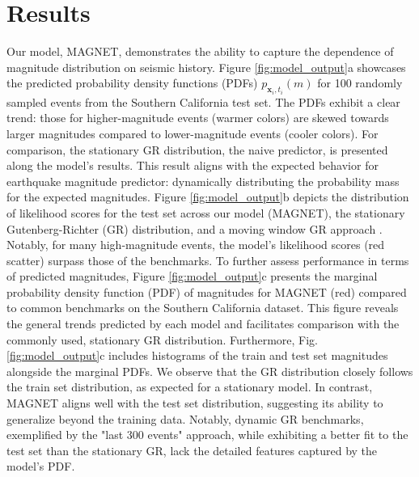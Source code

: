 \documentclass[pdflatex]{sn-jnl}
\begin{document}
\section{Results} \label{sec:results}


Our model, MAGNET, demonstrates the ability to capture the dependence of magnitude distribution on seismic history. Figure \ref{fig:model_output}a showcases the predicted probability density functions (PDFs) $p_{\textbf{x}_i, t_i}(m)$ for 100 randomly sampled events from the Southern California test set. The PDFs exhibit a clear trend: those for higher-magnitude events (warmer colors) are skewed towards larger magnitudes compared to lower-magnitude events (cooler colors). For comparison, the stationary GR distribution, the naive predictor, is presented along the model's results. This result aligns with the expected behavior for earthquake magnitude predictor: dynamically distributing the probability mass for the expected magnitudes. 
Figure \ref{fig:model_output}b depicts the distribution of likelihood scores for the test set across our model (MAGNET), the stationary Gutenberg-Richter (GR) distribution, and a moving window GR approach \cite{gulia_real-time_2019}. Notably, for many high-magnitude events, the model's likelihood scores (red scatter) surpass those of the benchmarks.
To further assess performance in terms of predicted magnitudes, Figure \ref{fig:model_output}c presents the marginal probability density function (PDF) of magnitudes for MAGNET (red) compared to common benchmarks on the Southern California dataset. This figure reveals the general trends predicted by each model and facilitates comparison with the commonly used, stationary GR distribution. Furthermore, Fig. \ref{fig:model_output}c includes histograms of the train and test set magnitudes alongside the marginal PDFs.  We observe that the GR distribution closely follows the train set distribution, as expected for a stationary model.  In contrast, MAGNET aligns well with the test set distribution, suggesting its ability to generalize beyond the training data. Notably, dynamic GR benchmarks, exemplified by the "last 300 events" approach,  while exhibiting a better fit to the test set than the stationary GR, lack the detailed features captured by the model's PDF.
\end{document}
